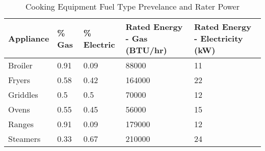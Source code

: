 \begin{table}[h]
\small
\centering
\caption[Cooking Equipment Fuel Type Prevelance and Rater Power]{Cooking Equipment Fuel Type Prevelance and Rater Power}
\label{tab:kitchen_prev_and_power}
\begin{tabular}{|l|l|l|l|l|}
\hline
\textbf{Appliance} & \textbf{\% Gas} & \textbf{\% Electric} & \textbf{Rated Energy - Gas (BTU/hr)} & \textbf{Rated Energy - Electricity (kW)} \\ \hline
Broiler            & 0.91            & 0.09                 & 88000                                & 11                                       \\ \hline
Fryers             & 0.58            & 0.42                 & 164000                               & 22                                       \\ \hline
Griddles           & 0.5             & 0.5                  & 70000                                & 12                                       \\ \hline
Ovens              & 0.55            & 0.45                 & 56000                                & 15                                       \\ \hline
Ranges             & 0.91            & 0.09                 & 179000                               & 12                                       \\ \hline
Steamers           & 0.33            & 0.67                 & 210000                               & 24                                       \\ \hline
\end{tabular}
\end{table}